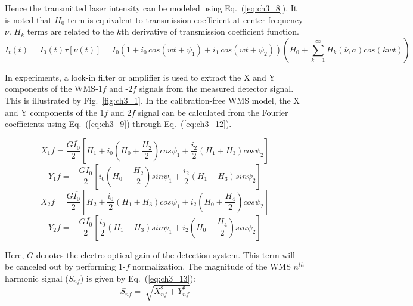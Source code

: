 Hence the transmitted laser intensity can be modeled using Eq.\ (\ref{eq:ch3_8}). It is noted that $H_0$ term is equivalent to transmission coefficient at center frequency $\overline{\nu}$. $H_k$ terms are related to the $k$th derivative of transmission coefficient function.  
\begin{equation}\label{eq:ch3_8}
I_t(t)=I_0(t)\tau[\nu(t)]=\overline{I_0}(1+i_0\,cos(wt+\psi_1)+i_1\,cos(wt+\psi_2))(H_0+\sum_{k=1}^{\infty}H_k(\overline{\nu},a)cos(kwt))
\end{equation}

In experiments, a lock-in filter or amplifier is used to extract the X and Y components of the WMS-$1f$ and -$2f$ signals from the measured detector signal. This is illustrated by Fig.\ \ref{fig:ch3_1}. In the calibration-free WMS model, the X and Y components of the $1f$ and $2f$ signal can be calculated from the Fourier coefficients using Eq.\ (\ref{eq:ch3_9}) through Eq.\ (\ref{eq:ch3_12}).

\begin{equation}\label{eq:ch3_9}
X_1f=\frac{G\overline{I_0}}{2}[H_1+i_0(H_0+\frac{H_2}{2})cos\psi_1+\frac{i_2}{2}(H_1+H_3)cos\psi_2]
\end{equation}
\begin{equation}
Y_1f=-\frac{G\overline{I_0}}{2}[i_0(H_0-\frac{H_2}{2})sin\psi_1+\frac{i_2}{2}(H_1-H_3)sin\psi_2]
\end{equation}
\begin{equation}
X_2f=\frac{G\overline{I_0}}{2}[H_2+\frac{i_0}{2}(H_1+H_3)cos\psi_1+i_2(H_0+\frac{H_4}{2})cos\psi_2]
\end{equation}
\begin{equation}\label{eq:ch3_12}
Y_2f=-\frac{G\overline{I_0}}{2}[\frac{i_0}{2}(H_1-H_3)sin\psi_1+i_2(H_0-\frac{H_4}{2})sin\psi_2]
\end{equation}

\noindent Here, $G$ denotes the electro-optical gain of the detection system. This term will be canceled out by performing 1-$f$ normalization. The magnitude of the WMS $n^{th}$ harmonic signal ($S_{nf}$) is given by Eq.\ (\ref{eq:ch3_13}):
\begin{equation}\label{eq:ch3_13}
S_{nf}=\sqrt[]{X_{nf}^2+Y_{nf}^2}
\end{equation}

